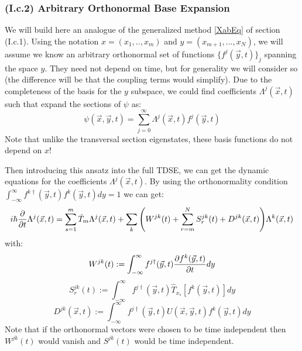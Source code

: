 \documentclass[11pt, a4paper]{article} %
\begin{document}
\subsubsection*{(I.c.2) Arbitrary Orthonormal Base Expansion}
We will build here an analogue of the generalized method \eqref{XabEq} of section (I.c.1). Using the notation $x=(x_1,..,x_m)$ and $y=(x_{m+1},...,x_N)$, we will assume we know an arbitrary orthonormal set of functions $\{ f^j(\vec{y},t) \}_j$ spanning the space $y$. They need not depend on time, but for generality we will consider so (the difference will be that the coupling terms would simplify). Due to the completeness of the basis for the $y$ subspace, we could find coefficients $\Lambda^j(\vec{x},t)$ such that expand the sections of $\psi$ as:\vspace{-0.3cm}
\begin{equation}
\psi(\vec{x},\vec{y},t)=\sum_{j=0}^\infty \Lambda^j(\vec{x},t) f^j(\vec{y},t)
\end{equation}\vspace{-0.3cm}
Note that unlike the transversal section eigenstates, these basis functions do not depend on $x$!

Then introducing this ansatz into the full TDSE, we can get the dynamic equations for the coefficients $\Lambda^j(\vec{x},t)$. By using the orthonormality condition $\int_{-\infty}^{\infty}f^{k\dagger}(\vec{y},t)f^k(\vec{y},t)dy=1$ we can get:\vspace{-0.2cm}
\begin{equation}
i\hbar \pdv{}{t}\Lambda^j(\vec{x},t)= \sum_{s=1}^m \hat{T}_m \Lambda^j(\vec{x},t) + \sum_k \qty( W^{jk}(t)+\sum_{r=m}^NS^{jk}_r(t)+D^{jk}(\vec{x},t) )\Lambda^k(\vec{x},t)
\end{equation}
with:\vspace{-0.3cm}
\begin{equation}
W^{jk}(t):=\int_{-\infty}^{\infty}f^{j\dagger}(\vec{y},t) \pdv{f^k(\vec{y},t)}{t} dy
\end{equation}
\begin{equation}
S^{jk}_r(t):=\int_{-\infty}^{\infty}f^{j\dagger}(\vec{y},t) \hat{T}_{x_s}[f^k(\vec{y},t)] dy
\end{equation}
\begin{equation}
D^{jk}(\vec{x},t):=\int_{-\infty}^{\infty}f^{j\dagger}(\vec{y},t)U(\vec{x},\vec{y},t) f^k(\vec{y},t) dy
\end{equation}
Note that if the orthonormal vectors were chosen to be time independent then $W^{jk}(t)$ would vanish and $S^{jk}(t)$ would be time independent. 
\end{document}
